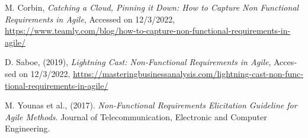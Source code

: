 {\begin{latin}
\begin{thebibliography}{9}
	M. Corbin,
	\textit{Catching a Cloud, Pinning it Down: How to Capture Non Functional Requirements in Agile},
	Accessed on 12/3/2022,
	\url{https://www.teamly.com/blog/how-to-capture-non-functional-requirements-in-agile/}
	
	 D. Saboe, (2019),
	 \textit{Lightning Cast: Non-Functional Requirements in Agile},
	 Accessed on 12/3/2022,
	 \url{https://masteringbusinessanalysis.com/lightning-cast-non-functional-requirements-in-agile/}
	 
	 	  

	M. Younas et al., (2017).
	\textit{Non-Functional Requirements Elicitation Guideline for Agile Methods}. Journal of Telecommunication, Electronic and Computer Engineering.
	 


	
	
\end{thebibliography}
\endgroup
\end{latin}

}
